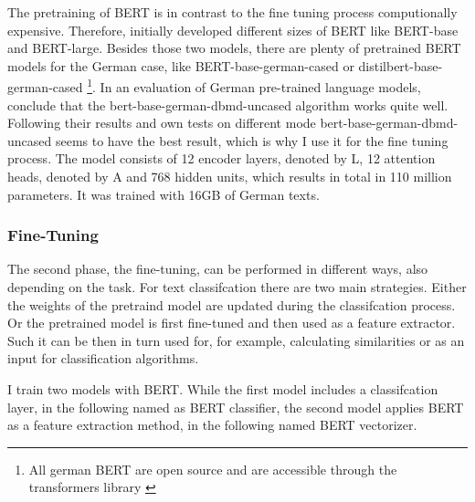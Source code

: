 \documentclass[12pt, a4paper, titlepage]{article}
\begin{document}
The pretraining of \ac{BERT} is in contrast to the fine tuning process computionally expensive. Therefore, \citet{devlin2018} initially developed different sizes of \ac{BERT} like \ac{BERT}-base and \ac{BERT}-large. Besides those two models, there are plenty of pretrained \ac{BERT} models for the German case, like \ac{BERT}-base-german-cased or distilbert-base-german-cased \footnote{All german \ac{BERT} are open source and are accessible through the transformers library \citep{wolf2020}}. In an evaluation of German pre-trained language models, \citep{assenmacher2021} conclude that the bert-base-german-dbmd-uncased algorithm works quite well. Following their results and own tests on different mode bert-base-german-dbmd-uncased seems to have the best result, which is why I use it for the fine tuning process. The model consists of 12 encoder layers, denoted by L, 12 attention heads, denoted by A and 768 hidden units, which results in total in 110 million parameters. It was trained with 16GB of German texts. 

\subsubsection*{Fine-Tuning}
The second phase, the fine-tuning, can be performed in different ways, also depending on the task. For text classifcation there are two main strategies. Either the weights of the pretraind model are updated during the classifcation process. Or the pretrained model is first fine-tuned and then used as a feature extractor.  Such it can be then in turn used for, for example, calculating similarities or as an input for classification algorithms. 

I train two models with \ac{BERT}. While the first model includes a classifcation layer, in the following named as \ac{BERT} classifier, the second model applies \ac{BERT} as a feature extraction method, in the following named \ac{BERT} vectorizer. 
\end{document}
